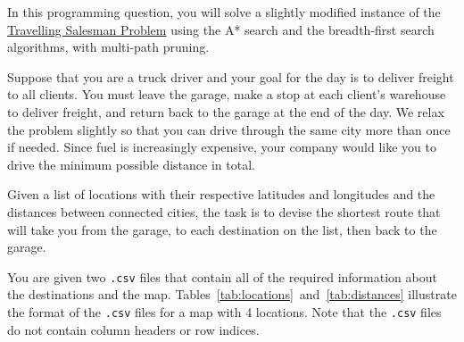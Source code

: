 \documentclass[12pt]{article}
\begin{document}
In this programming question, you will solve a slightly modified instance of the \href{https://en.wikipedia.org/wiki/Travelling_salesman_problem}{Travelling Salesman Problem} using the A* search and the breadth-first search algorithms, with multi-path pruning.

Suppose that you are a truck driver and your goal for the day is to deliver freight to all clients. You must leave the garage, make a stop at each client's warehouse to deliver freight, and return back to the garage at the end of the day. We relax the problem slightly so that you can drive through the same city more than once if needed. Since fuel is increasingly expensive, your company would like you to drive the minimum possible distance in total.

Given a list of locations with their respective latitudes and longitudes and the distances between connected cities, the task is to devise the shortest route that will take you from the garage, to each destination on the list, then back to the garage.

You are given two \texttt{.csv} files that contain all of the required information about the destinations and the map. Tables~\ref{tab:locations}~and~\ref{tab:distances} illustrate the format of the \texttt{.csv} files for a map with 4 locations. Note that the \texttt{.csv} files do not contain column headers or row indices. 
\end{document}
